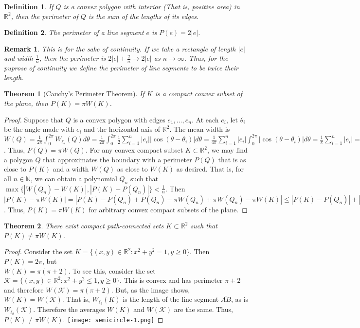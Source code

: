 \documentclass[crop=false,class=book]{standalone}
\theoremstyle{mystyle}
\newtheorem{theorem}{Theorem}[section]
\newtheorem{definition}{Definition}[section]
\newtheorem{remark}{Remark}[section]
\begin{document}
\begin{definition}
If $Q$ is a convex polygon with interior (That is, positive area) in $\mathbb{R}^2$, then the perimeter of $Q$ is the sum of the lengths of its edges. 
\end{definition}
\begin{definition}
The perimeter of a line segment $e$ is $P(e) = 2|e|$.
\end{definition}
\begin{remark}
This is for the sake of continuity. If we take a rectangle of length $|e|$ and width $\frac{1}{n}$, then the perimeter is $2|e|+\frac{2}{n} \rightarrow 2|e|$ as $n\rightarrow \infty$. Thus, for the puprose of continuity we define the perimeter of line segments to be twice their length.
\end{remark}
\begin{theorem}[Cauchy's Perimeter Theorem]
If $K$ is a compact convex subset of the plane, then $P(K) = \pi W(K)$.
\end{theorem}
\begin{proof}
Suppose that $Q$ is a convex polygon with edges $e_1,\hdots, e_n$. At each $e_i$, let $\theta_i$ be the angle made with $e_i$ and the horizontal axis of $\mathbb{R}^2$. The mean width is $W(Q) = \frac{1}{2\pi}\int_{0}^{2\pi} W_{\ell_\theta}(Q)d\theta = \frac{1}{2\pi} \int_{0}^{2\pi} \frac{1}{2} \sum_{i=1}^{n} |e_i||\cos(\theta-\theta_i)|d\theta = \frac{1}{4\pi}\sum_{i=1}^{n} |e_i|\int_{0}^{2\pi} |\cos(\theta-\theta_i)|d\theta = \frac{1}{\pi} \sum_{i=1}^{n} |e_i| = \frac{1}{\pi} P(Q)$. Thus, $P(Q) = \pi W(Q)$. For any convex compact subset $K\subset \mathbb{R}^2$, we may find a polygon $Q$ that approximates the boundary with a perimeter $P(Q)$ that is as close to $P(K)$ and a width $W(Q)$ as close to $W(K)$ as desired. That is, for all $n\in \mathbb{N}$, we can obtain a polynomial $Q_n$ such that $\max\{|W(Q_n)-W(K)|,|P(K)-P(Q_n)|\}< \frac{1}{n}$. Then $|P(K)-\pi W(K)| = |P(K) - P(Q_n)+P(Q_n)-\pi W(Q_n)+\pi W(Q_n)-\pi W(K)| \leq |P(K)-P(Q_n)|+|P(Q_n)-\pi W(Q_n)|+\pi|W(Q_n)-W(K)| < \frac{1}{n} + 0 + \frac{\pi}{n} = \frac{1+\pi}{n} \rightarrow 0$. Thus, $P(K) = \pi W(K)$ for arbitrary convex compact subsets of the plane.
\end{proof}
\begin{theorem}
There exist compact path-connected sets $K\subset \mathbb{R}^2$ such that $P(K) \ne \pi W(K)$.
\end{theorem}
\begin{proof}
Consider the set $K = \{(x,y) \in \mathbb{R}^2: x^2+y^2=1, y\geq 0\}$. Then $P(K) = 2\pi$, but \\ $W(K) = \pi(\pi+2)$. To see this, consider the set $\mathcal{K} = \{(x,y)\in \mathbb{R}^2: x^2 + y^2 \leq 1, y\geq 0\}$. This is convex and has perimeter $\pi+2$ and therefore $W(\mathcal{K}) = \pi(\pi+2)$. But, as the image shows, $W(K) = W(\mathcal{K})$. That is, $W_{\ell_{\theta}}(K)$ is the length of the line segment $\overline{AB}$, as is $W_{\ell_{\theta}}(\mathcal{K})$. Therefore the averages $W(K)$ and $W(\mathcal{K})$ are the same. Thus, $P(K) \ne \pi W(K)$.
\texttt{[image: semicircle-1.png]}
\end{proof}
\end{document}

